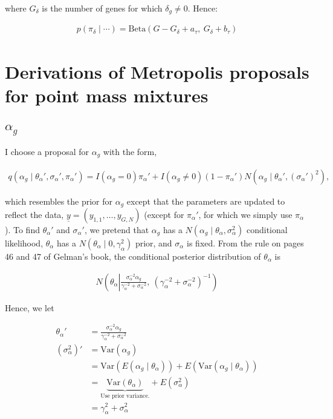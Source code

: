 \documentclass{article}\usepackage{graphicx, color}
\begin{document}
\begin{flushleft}
where $G_\delta$ is the number of genes for which $\delta_g \ne 0$. Hence:

\begin{align*}
p(\pi_\delta \mid \cdots) = \text{Beta}(G - G_\delta + a_\tau, \ G_\delta + b_\tau)
\end{align*}










\section{Derivations of Metropolis proposals for point mass mixtures}




\subsection{$\alpha_g$}

I choose a proposal for $\alpha_g$ with the form,

\begin{align*}
q(\alpha_g \mid \theta_\alpha', \sigma_\alpha', \pi_\alpha') = I(\alpha_g = 0) \pi_\alpha'  + I(\alpha_g \ne 0) (1 - \pi_\alpha') N(\alpha_g \mid \theta_\alpha', (\sigma_\alpha')^2),
\end{align*}

which resembles the prior for $\alpha_g$ except that the parameters are updated to reflect the data, $\underline{y}  = (y_{1, 1}, \ldots, y_{G, N})$ (except for $\pi_\alpha'$, for which we simply use $\pi_\alpha$). To find $\theta_\alpha'$ and $\sigma_\alpha'$, we pretend that $\alpha_g$ has a $N(\alpha_g \mid \theta_\alpha, \sigma_\alpha^2)$ conditional likelihood, $\theta_\alpha$ has a $N(\theta_\alpha \mid 0, \gamma_\alpha^2)$ prior, and $\sigma_\alpha$ is fixed. From the rule on pages 46 and 47 of Gelman's book, the conditional posterior distribution of $\theta_\alpha$ is

\begin{align*}
N\left (\theta_\alpha \left |   \frac{ \sigma_\alpha^{-2} \alpha_g }{\gamma_\alpha^{-2} + \sigma_\alpha^{-2}} \right ., \ (\gamma_\alpha^{-2} + \sigma_\alpha^{-2})^{-1} \right )
\end{align*}

Hence, we let

\begin{align*}
\theta_\alpha' &=  \frac{ \sigma_\alpha^{-2} \alpha_g }{\gamma_\alpha^{-2} + \sigma_\alpha^{-2}} \\
(\sigma_\alpha^2)' &= \text{Var}(\alpha_g) \\
&= \text{Var}( E(\alpha_g \mid \theta_\alpha)) + E( \text{Var}(\alpha_g \mid \theta_\alpha)) \\
&= \underbrace{\text{Var}(\theta_\alpha)}_{\text{Use prior variance.}} + E(\sigma_\alpha^2) \\
&= \gamma_\alpha^2 + \sigma_\alpha^2
\end{align*}



\end{flushleft}
\end{document}
